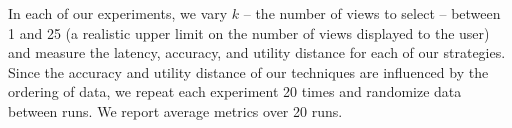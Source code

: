 In each of our experiments, we vary $k$ -- the number of views to select -- between
1 and 25 (a realistic upper limit on the number of views displayed to the user)
and measure the latency, accuracy, and utility distance for each of our
strategies. 
Since the accuracy and utility distance of our techniques are influenced by the
ordering of data, we repeat each experiment 20
times and randomize data between runs. We report average
metrics over 20 runs.









